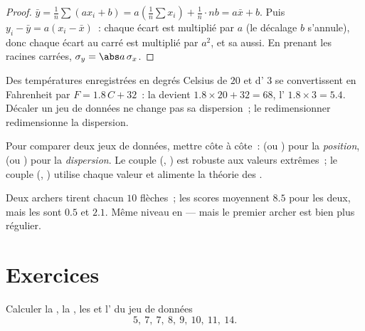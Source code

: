 \begin{proof}
$\bar y = \frac1n \sum (a x_i + b) = a\left(\frac1n\sum x_i\right) +
\frac1n \cdot nb = a\bar x + b$. Puis
$y_i - \bar y = a(x_i - \bar x)$~: chaque écart est multiplié par $a$
(le décalage $b$ s'annule), donc chaque écart au carré est multiplié par
$a^2$, et sa  aussi. En prenant les racines carrées,
$\sigma_y = \abs a\,\sigma_x$.
\end{proof}

\begin{example}
Des températures enregistrées en degrés Celsius de  $20$ et
d' $3$ se convertissent en Fahrenheit par
$F = 1.8\,C + 32$~: la  devient $1.8 \times 20 + 32 = 68$,
l' $1.8 \times 3 = 5.4$. Décaler un jeu de données ne change
pas sa dispersion~; le redimensionner redimensionne la dispersion.
\end{example}

\begin{method}\label{met:g11:stat:compare}
Pour comparer deux jeux de données, mettre côte à côte~:  (ou
) pour la \emph{position},  (ou )
pour la \emph{dispersion}. Le couple (, ) est
robuste aux valeurs extrêmes~; le couple (, ) utilise
chaque valeur et alimente la théorie des .
\end{method}

\begin{example}
Deux archers tirent chacun $10$ flèches~; les scores moyennent $8.5$
pour les deux, mais les  sont $0.5$ et $2.1$. Même niveau en
 --- mais le premier archer est bien plus régulier.
\end{example}

\section{Exercices}

\begin{exercise}[$\star$]\label{exo:g11:stat:1}
Calculer la , la , les  et l'
du jeu de données
\[
5,\ 7,\ 7,\ 8,\ 9,\ 10,\ 11,\ 14 .
\]
\end{exercise}


